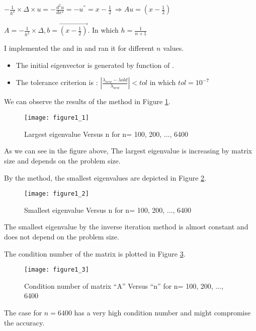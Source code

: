 {{$-\frac{1}{h^2}\times \Delta\times u=-\frac{d^2u}{dx^2}=-u^{''}=x-\frac{1}{2} ~\Rightarrow A u=(x-\frac{1}{2})$

$A=-\frac{1}{h^2}\times \Delta , b= \overrightarrow{(x-\frac{1}{2})}$. In which $h=\frac{1}{n+1}$

I implemented the  and  in  and ran it for different $n$ values.
\begin{itemize}
    \item The initial eigenvector is generated by  function of .
    \item The tolerance criterion is : $|\frac{\lambda_{new}-\lambda{old}}{\lambda_{new}}|<tol$ in which $tol=10^{-7}$
\end{itemize}

We can observe the results of the  method in Figure \ref{fig:fig1_1}.

\begin{figure}[H]
    \centering
    \texttt{[image: figure1\_1]}
    \caption{Largest eigenvalue Versus n for n= 100, 200, ..., 6400}
    \label{fig:fig1_1}
\end{figure}

As we can see in the figure above,  The largest eigenvalue is increasing by matrix size and depends on the problem size.

By the  method, the smallest eigenvalues are depicted in Figure \ref{fig:fig1_2}.

\begin{figure}[H]
    \centering
    \texttt{[image: figure1\_2]}
    \caption{Smallest eigenvalue Versus n for n= 100, 200, ..., 6400}
    \label{fig:fig1_2}
\end{figure}

The smallest eigenvalue by the inverse iteration method is almost constant and does not depend on the problem size.

The condition number of the matrix is plotted in Figure \ref{fig:fig1_3}.

\begin{figure}[H]
    \centering
    \texttt{[image: figure1\_3]}
    \caption{Condition number of matrix ``A'' Versus ``n'' for n= 100, 200, ..., 6400}
    \label{fig:fig1_3}
\end{figure}

The case for $n=6400$ has a very high condition number and might compromise the accuracy.

}}
